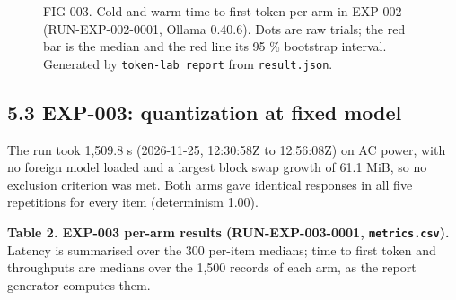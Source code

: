 \documentclass[
]{article}
\makeatletter
\newcommand*\pandocbounded[1]{%
  \sbox\pandoc@box{#1}%
  \Gscale@div\@tempa{\textheight}{\dimexpr\ht\pandoc@box+\dp\pandoc@box\relax}%
  \Gscale@div\@tempb{\linewidth}{\wd\pandoc@box}%
  \ifdim\@tempb\p@<\@tempa\p@\let\@tempa\@tempb\fi%
  \ifdim\@tempa\p@<\p@\scalebox{\@tempa}{\usebox\pandoc@box}%
  \else\usebox{\pandoc@box}%
  \fi%
}
\makeatother
\begin{document}
\begin{figure}
\centering
\pandocbounded{}
\caption{FIG-003. Cold and warm time to first token per arm in EXP-002
(RUN-EXP-002-0001, Ollama 0.40.6). Dots are raw trials; the red bar is
the median and the red line its 95 \% bootstrap interval. Generated by
\texttt{token-lab\ report} from \texttt{result.json}.}
\end{figure}

\subsection{5.3 EXP-003: quantization at fixed
model}\label{exp-003-quantization-at-fixed-model}

The run took 1,509.8 s (2026-11-25, 12:30:58Z to 12:56:08Z) on AC power,
with no foreign model loaded and a largest block swap growth of 61.1
MiB, so no exclusion criterion was met. Both arms gave identical
responses in all five repetitions for every item (determinism 1.00).

\textbf{Table 2. EXP-003 per-arm results (RUN-EXP-003-0001,
\texttt{metrics.csv}).} Latency is summarised over the 300 per-item
medians; time to first token and throughputs are medians over the 1,500
records of each arm, as the report generator computes them.
\end{document}
